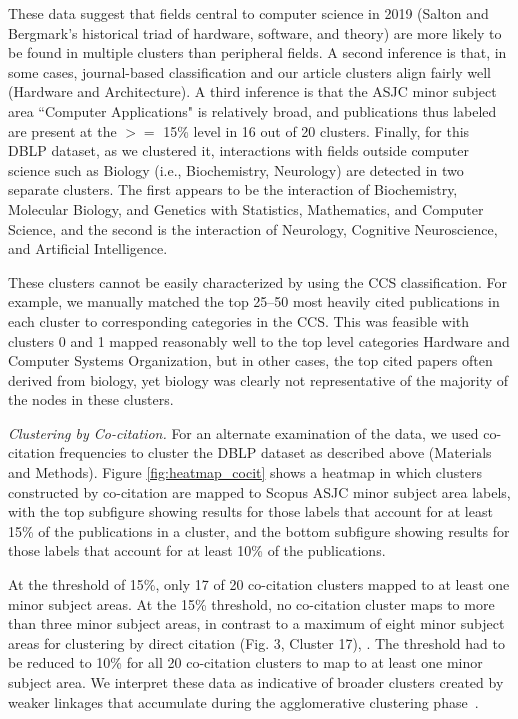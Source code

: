 These data suggest that fields central to computer science in 2019 (Salton and Bergmark's historical triad of hardware, software, and theory) are more likely to be found in multiple clusters than peripheral fields. A second inference is that, in some cases, journal-based classification and our article clusters align fairly well (Hardware and Architecture). 
A third inference is that the ASJC minor subject area ``Computer Applications" is relatively broad, and publications thus labeled are present at the $>=$ 15\% level in 16 out of 20 clusters.  Finally,   for this DBLP dataset, as we clustered it, interactions with fields outside computer science such as Biology  (i.e., Biochemistry, Neurology)  are  detected in two separate clusters. The first appears to be the interaction of Biochemistry, Molecular Biology, and Genetics with Statistics, Mathematics, and Computer Science, and the second is the interaction of Neurology, Cognitive Neuroscience, and Artificial Intelligence.

These clusters cannot be easily characterized by using the CCS classification. For example, we manually matched the top 25--50 most heavily cited publications in each cluster to corresponding categories in the CCS. This was feasible with clusters 0 and 1 mapped reasonably well to the top level categories Hardware and Computer Systems Organization, but in other cases, the top cited papers often derived from biology, yet biology was clearly not  representative of the majority of the nodes in these clusters. 

\emph{Clustering by Co-citation.} For an alternate examination of the data, we used co-citation frequencies to cluster the DBLP dataset as described above (Materials and Methods). Figure \ref{fig:heatmap_cocit} shows a heatmap in which clusters constructed by co-citation are mapped to Scopus ASJC minor subject area labels, with the top subfigure showing results for those labels that account for at least 15\% of the publications in a cluster, and the bottom subfigure showing results for those labels that account for at least 10\% of the publications. 

At the threshold of 15\%, only 17 of 20 co-citation clusters mapped to at least one minor subject areas. At the 15\% threshold, no co-citation cluster maps to more than three minor subject areas, in contrast to a maximum of eight minor subject areas for clustering by direct citation (Fig. 3, Cluster 17), . The threshold had to be reduced to 10\% for all 20 co-citation clusters to map to at least one minor subject area. We interpret these data as indicative of broader clusters created by weaker linkages that accumulate during the agglomerative clustering phase~\cite{small_clustering_1985}. 

